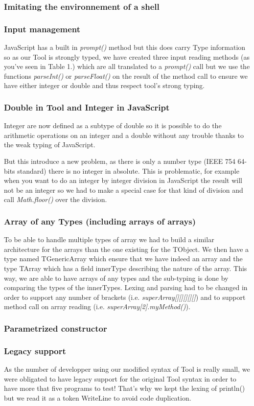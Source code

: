 \subsubsection{Imitating the environnement of a shell}
\subsubsection{Input management}
JavaScript has a built in \emph{prompt()} method but this does carry Type information so as our Tool is strongly typed, we have created three input reading methods (as you've seen in Table 1.) which are all translated to a \emph{prompt()} call but we use the functions \emph{parseInt()} or \emph{parseFloat()} on the result of the method call to ensure we have either integer or double and thus respect tool's strong typing.


\subsubsection{Double in Tool and Integer in JavaScript}
Integer are now defined as a subtype of double so it is possible to do the arithmetic operations on an integer and a double without any trouble thanks to the weak typing of JavaScript.

But this introduce a new problem, as there is only a number type (IEEE 754 64-bits standard) there is no integer in absolute. This is problematic, for example when you want to do an integer by integer division
in JavaScript the result will not be an integer so we had to make a special case for that kind of division and call \emph{Math.floor()} over the division.

\subsubsection{Array of any Types (including arrays of arrays)}
To be able to handle multiple types of array we had to build a similar architecture for the arrays than the one existing for the TObject. We then have a type named TGenericArray which ensure that we have indeed an array and the type TArray which has a field innerType describing the nature of the array.
This way, we are able to have arrays of any types and the sub-typing is done by comparing the types of the innerTypes.
Lexing and parsing had to be changed in order to support any number of brackets (i.e. \emph{superArray[][][][][]}) and to support method call on array reading (i.e. \emph{superArray[2].myMethod()}).

\subsubsection{Parametrized constructor}

\subsubsection{Legacy support}
As the number of developper using our modified syntax of Tool is really small, we were obligated to have legacy support for the original Tool syntax in order to have more that five programs to test!
That's why we kept the lexing of println() but we read it as a token WriteLine to avoid code duplication.

